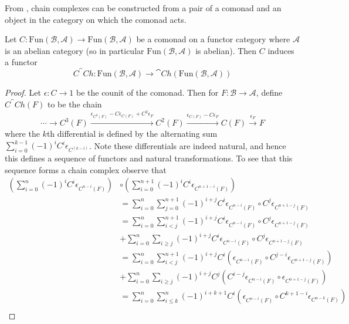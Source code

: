 From \cite[Defn 2.4]{JohnsonB.2004Dcwc}, chain complexes can be constructed from a pair of a comonad and an object in the category on which the comonad acts.
\begin{lem}[label=lem:comonadChain]
    Let $C:\text{Fun}(\mathcal{B},\mathcal{A})\rightarrow \text{Fun}(\mathcal{B},\mathcal{A})$ be a comonad on a functor category where $\mathcal{A}$ is an abelian category (so in particular $\text{Fun}(\mathcal{B},\mathcal{A})$ is abelian). Then $C$ induces a functor $$C^\cat{Ch}:\text{Fun}(\mathcal{B},\mathcal{A})\rightarrow \cat{Ch}(\text{Fun}(\mathcal{B},\mathcal{A}))$$
\end{lem}
\begin{proof}
    Let $\epsilon:C\rightarrow 1$ be the counit of the comonad. Then for $F :\mathcal{B}\rightarrow \mathcal{A}$, define $C^\cat{Ch}(F)$ to be the chain
    \begin{equation*}
        \cdots \rightarrow C^3(F)\xrightarrow{\epsilon_{C^2(F)}-C\epsilon_{C(F)}+C^2\epsilon_F}C^2(F)\xrightarrow{\epsilon_{C(F)}-C\epsilon_F}C(F)\xrightarrow{\epsilon_F} F
    \end{equation*}
    where the $k$th differential is defined by the alternating sum $\sum_{i=0}^{k-1}(-1)^iC^i\epsilon_{C^{(k-i)}}$. Note these differentials are indeed natural, and hence this defines a sequence of functors and natural transformations. To see that this sequence forms a chain complex observe that
    \begin{align*}
        \left(\sum_{i=0}^{n}(-1)^iC^i\epsilon_{C^{n-i}(F)}\right)&\circ \left(\sum_{i=0}^{n+1}(-1)^iC^i\epsilon_{C^{n+1-i}(F)}\right) \\
        &= \sum_{i=0}^n\sum_{j=0}^{n+1}(-1)^{i+j}C^i\epsilon_{C^{n-i}(F)}\circ C^j\epsilon_{C^{n+1-j}(F)} \\
        &= \sum_{i=0}^n\sum_{i < j}^{n+1}(-1)^{i+j}C^i\epsilon_{C^{n-i}(F)}\circ C^j\epsilon_{C^{n+1-j}(F)} \\
        &+ \sum_{i=0}^n\sum_{i\geq j}(-1)^{i+j}C^i\epsilon_{C^{n-i}(F)}\circ C^j\epsilon_{C^{n+1-j}(F)} \\
        &= \sum_{i=0}^n\sum_{i < j}^{n+1}(-1)^{i+j}C^i\left(\epsilon_{C^{n-i}(F)}\circ C^{j-i}\epsilon_{C^{n+1-j}(F)} \right)\\
        &+ \sum_{i=0}^n\sum_{i\geq j}(-1)^{i+j}C^j\left(C^{i-j}\epsilon_{C^{n-i}(F)}\circ \epsilon_{C^{n+1-j}(F)} \right)\\ 
        &= \sum_{i=0}^n\sum_{i\leq k}^n(-1)^{i+k+1}C^{i}\left(\epsilon_{C^{n-i}(F)}\circ C^{k+1-i}\epsilon_{C^{n-k}(F)} \right) \tag{Substituting $k = j-1$}\\

\end{align*}
\end{proof}
